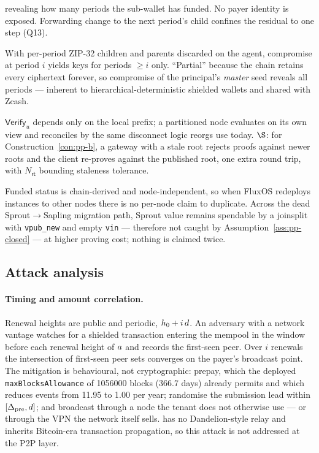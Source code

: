 \begin{description}
    revealing how many periods the sub-wallet has funded. No payer identity is exposed. Forwarding
    change to the next period's child confines the residual to one step (Q13).
  \item[I6, forward secrecy.] With per-period ZIP-32 children and parents discarded on the agent,
    compromise at period $i$ yields keys for periods $\ge i$ only. ``Partial'' because the chain
    retains every ciphertext forever, so compromise of the principal's \emph{master} seed reveals all
    periods --- inherent to hierarchical-deterministic shielded wallets and shared with Zcash.
  \item[I7, liveness under partition.] $\mathsf{Verify}_u$ depends only on the local prefix; a
    partitioned node evaluates on its own view and reconciles by the same disconnect logic reorgs use
    today. $\S$: for Construction~\ref{con:pp-b}, a gateway with a stale root rejects proofs against
    newer roots and the client re-proves against the published root, one extra round trip, with
    $N_{\mathsf{rt}}$ bounding staleness tolerance.
  \item[I8, no double-claim across migration.] Funded status is chain-derived and node-independent, so
    when FluxOS redeploys instances to other nodes there is no per-node claim to duplicate. Across the
    dead Sprout$\to$Sapling migration path, Sprout value remains spendable by a joinsplit with
    \texttt{vpub\_new} and empty \texttt{vin} --- therefore not caught by
    Assumption~\ref{ass:pp-closed} --- at higher proving cost; nothing is claimed twice.
\end{description}

\subsection{Attack analysis}
\label{sec:pp-attacks}

\paragraph{Timing and amount correlation.} Renewal heights are public and periodic,
$h_0 + i\,d$. An adversary with a network vantage watches for a shielded transaction entering
the mempool in the window before each renewal height of $a$ and records the first-seen peer. Over
$i$ renewals the intersection of first-seen peer sets converges on the payer's broadcast point.
The mitigation is behavioural, not cryptographic: prepay, which the deployed
\texttt{max\allowbreak{}Blocks\allowbreak{}Allowance} of \num{1056000} blocks (\num{366.7} days) already permits and which
reduces events from \num{11.95} to \num{1.00} per year; randomise the submission lead within
$[\Delta_{\mathrm{pre}}, d]$; and broadcast through a node the tenant does not otherwise use --- or
through the VPN the network itself sells. \fluxd{} has no Dandelion-style relay and inherits
Bitcoin-era transaction propagation, so this attack is not addressed at the P2P layer.

